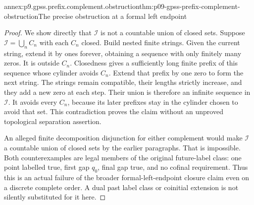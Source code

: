 \begin{annexitem}{annex:p9.gpss.prefix.complement.obstruction}{thm:p09-gpss-prefix-complement-obstruction}{The precise obstruction at a formal left endpoint}
\begin{proof}
We show directly that
\(\mathcal I\) is not a
countable union of closed sets.
Suppose \(\mathcal I=\bigcup_n C_n\)
with each \(C_n\) closed.
Build nested finite strings.
Given the current string,
extend it by ones forever,
obtaining a sequence with
only finitely many zeros.
It is outside \(C_n\).
Closedness gives a sufficiently
long finite prefix of this
sequence whose cylinder avoids
\(C_n\). Extend that prefix
by one zero to form the
next string. The strings
remain compatible, their
lengths strictly increase,
and they add a new zero
at each step. Their union
is therefore an infinite
sequence in \(\mathcal I\).
It avoids every \(C_n\),
because its later prefixes
stay in the cylinder chosen
to avoid that set. This
contradiction proves the
claim without an unproved
topological separation assertion.

An alleged finite decomposition
disjunction for either complement
would make \(\mathcal I\)
a countable union of closed
sets by the earlier paragraphs.
That is impossible. Both
counterexamples are legal
members of the original
future-label class: one
point labelled true, first
gap \(q_0\), final gap true,
and no cofinal requirement.
Thus this is an actual
failure of the broader
formal-left-endpoint closure
claim even on a discrete
complete order. A dual past
label class or coinitial
extension is not silently
substituted for it here.
\end{proof}
\end{annexitem}


